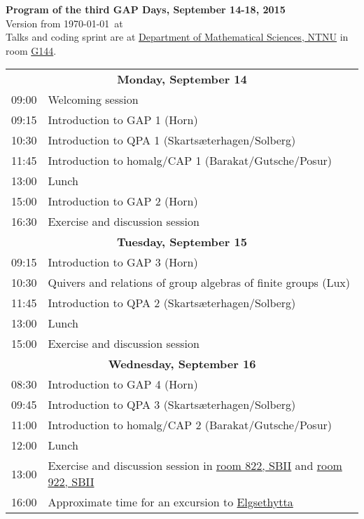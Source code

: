 \documentclass[12pt,a4paper]{article}
\begin{document}
\begin{center}
{\huge\textbf{Program of the third GAP Days, September 14-18, 2015}\\[2mm]}
Version from \today\ at \currenttime\\[2mm]
Talks and coding sprint are at
\href{http://www.ntnu.edu/imf)}{Department of Mathematical Sciences,
  NTNU} in room \href{http://s.mazemap.com/1RvAr1E}{G144}.
\end{center}

\newcommand{\talk}[3]{#1 & #2 \\ & \textit{#3} \\}

\newcommand{\newday}[1]{\multicolumn{2}{c}{{\large\textbf{#1}}} \\[1em]}


\begin{tabular}{rp{14.5cm}}
%
\newday{Monday, September 14}
09:00 & Welcoming session \\
09:15 & Introduction to GAP 1 (Horn)\\
10:30 & Introduction to QPA 1 (Skarts\ae terhagen/Solberg)\\
11:45 & Introduction to homalg/CAP 1 (Barakat/Gutsche/Posur)\\
13:00 & Lunch \\
15:00 & Introduction to GAP 2 (Horn)\\
16:30 & Exercise and discussion session

%
%
\\
%
%
\newday{Tuesday, September 15}
09:15 & Introduction to GAP 3 (Horn)\\
10:30 & Quivers and relations of group algebras of finite groups (Lux) \\
11:45 & Introduction to QPA 2 (Skarts\ae terhagen/Solberg)\\
13:00 & Lunch \\
15:00 & Exercise and discussion session

%
%
\\
%
%
\newday{Wednesday, September 16}
08:30 & Introduction to GAP 4 (Horn)\\
09:45 & Introduction to QPA 3 (Skarts\ae terhagen/Solberg)\\
11:00 & Introduction to homalg/CAP 2 (Barakat/Gutsche/Posur)\\
12:00 & Lunch \\
13:00 & Exercise and discussion session in \href{http://s.mazemap.com/1eH0Iyb}{room 822, SBII} and
\href{http://s.mazemap.com/1FAC2wn}{room 922, SBII}\\
16:00 & Approximate time for an excursion to
\href{http://www.elgsethytta.com/public.aspx?pageid=88995}{Elgsethytta}
\end{tabular}
\end{document}
